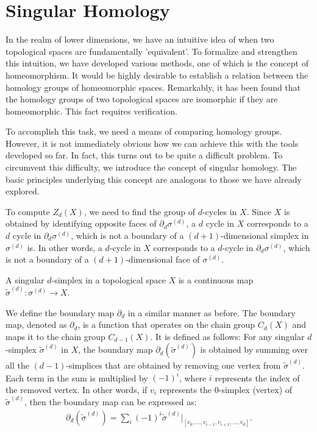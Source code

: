 \section{Singular Homology}
\label{SingularHomology}
In the realm of lower dimensions, we have an intuitive idea of when two topological spaces are fundamentally 'equivalent'. To formalize and strengthen this intuition, we have developed various methods, one of which is the concept of homeomorphism. It would be highly desirable to establish a relation between the homology groups of homeomorphic spaces. Remarkably, it has been found that the homology groups of two topological spaces are isomorphic if they are homeomorphic. This fact requires verification.

To accomplish this task, we need a means of comparing homology groups. However, it is not immediately obvious how we can achieve this with the tools developed so far. In fact, this turns out to be quite a difficult problem. To circumvent this difficulty, we introduce the concept of singular homology. The basic principles underlying this concept are analogous to those we have already explored.

To compute \( Z_{d}(X) \), we need to find the group of \( d \)-cycles in \( X \). Since \( X \) is obtained by identifying opposite faces of \( \partial_{d} \sigma^{(d)} \), a \( d \) cycle in \( X \) corresponds to a \( d \) cycle in \( \partial_{d} \sigma^{(d)} \), which is not a boundary of a \( (d+1) \)-dimensional simplex in \( \sigma^{(d)} \) is. In other words, a \( d \)-cycle in \( X \) corresponds to a \( d \)-cycle in \( \partial_{d} \sigma^{(d)} \), which is not a boundary of a \( (d+1) \)-dimensional face of \( \sigma^{(d)} \).

\begin{definition}
A singular \( d \)-simplex in a topological space \( X \) is a continuous map \( \tilde{\sigma}^{(d)}: \sigma^{(d)} \to X \).
\end{definition}

We define the boundary map \( \partial_{d} \) in a similar manner as before. The boundary map, denoted as \( \partial_{d} \), is a function that operates on the chain group \( C_{d}(X) \) and maps it to the chain group \( C_{d-1}(X) \). It is defined as follows: For any singular \( d \)-simplex \( \tilde{\sigma}^{(d)} \) in \( X \), the boundary map \( \partial_{d}(\tilde{\sigma}^{(d)}) \) is obtained by summing over all the \( (d-1) \)-simplices that are obtained by removing one vertex from \( \tilde{\sigma}^{(d)} \). Each term in the sum is multiplied by \( (-1)^{i} \), where \( i \) represents the index of the removed vertex. In other words, if \( v_{i} \) represents the \( 0 \)-simplex (vertex) of \( \tilde{\sigma}^{(d)} \), then the boundary map can be expressed as:
\begin{align}
\partial_{d}(\tilde{\sigma}^{(d)}) = \sum_{i} (-1)^{i} \tilde{\sigma}^{(d)}\vert_{[v_0, \ldots, v_{i-1}, v_{i+1}, \ldots, v_d]}.
\end{align}

